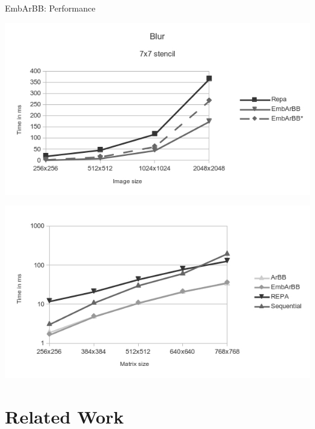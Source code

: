 \documentclass[xcolor=dvipsnames]{beamer}
\begin{document}
\begin{frame}{EmbArBB: Performance} 

 \begin{minipage}{.48\linewidth}
 \includegraphics[width=\linewidth]{blurchart.jpg}
 \end{minipage} %
 \begin{minipage}{.48\linewidth}
 \includegraphics[width=\linewidth]{mmchart1.jpg}
 \end{minipage}

\end{frame} 


\section{Related Work} 
\end{document}
